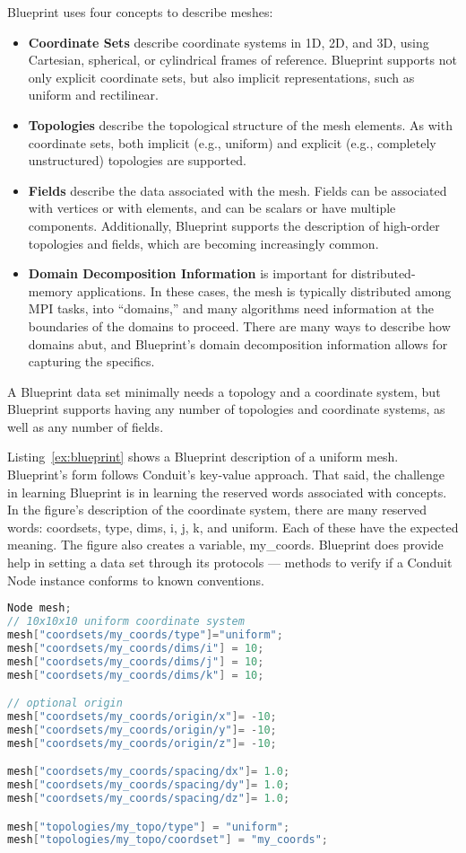 Blueprint uses four concepts to describe meshes:
\begin{itemize}
  \item \textbf{Coordinate Sets} describe coordinate systems in 1D, 2D, and 3D,
using Cartesian, spherical, or cylindrical frames of reference.
%
Blueprint supports not only explicit coordinate sets, but also implicit representations,
such as uniform and rectilinear.
  \item \textbf{Topologies} describe the topological structure of the mesh elements.
%
As with coordinate sets, both implicit (e.g., uniform) and explicit
(e.g., completely unstructured) topologies are supported.
  \item \textbf{Fields} describe the data associated with the mesh.
Fields can be associated with vertices or with elements, and
can be scalars or have multiple components.
%
Additionally, Blueprint supports the description of high-order
topologies and fields, which are becoming increasingly common.
  \item \textbf{Domain Decomposition Information} is important for distributed-memory applications.
%
In these cases, the mesh is typically distributed among MPI tasks, into ``domains,'' and
many algorithms need information at the boundaries of the domains to proceed.
%
There are many ways to describe how domains abut, and Blueprint's domain decomposition information
allows for capturing the specifics.
\end{itemize}
A Blueprint data set minimally needs a topology and a coordinate system,
but Blueprint supports having any number of topologies and coordinate
systems, as well as any number of fields.
%


Listing~\ref{ex:blueprint} shows a Blueprint description of a uniform mesh.
%
Blueprint's form follows Conduit's key-value approach.
%
That said, the challenge in learning Blueprint is in learning the reserved words associated
with concepts.
%
In the figure's description of the coordinate system, there are many reserved words:
coordsets, type, dims,  i, j, k, and uniform.
%
Each of these have the expected meaning.
%
The figure also creates a variable, my\_coords.
%
Blueprint does provide help in setting a data set through its protocols ---
methods to verify if a Conduit Node instance conforms to known conventions.


\begin{lstlisting}[language=C++,caption={\label{ex:blueprint}An example of a specifying a $10^3$ uniform grid in Blueprint.}]
Node mesh;
// 10x10x10 uniform coordinate system
mesh["coordsets/my_coords/type"]="uniform";
mesh["coordsets/my_coords/dims/i"] = 10;
mesh["coordsets/my_coords/dims/j"] = 10;
mesh["coordsets/my_coords/dims/k"] = 10;

// optional origin
mesh["coordsets/my_coords/origin/x"]= -10;
mesh["coordsets/my_coords/origin/y"]= -10;
mesh["coordsets/my_coords/origin/z"]= -10;

mesh["coordsets/my_coords/spacing/dx"]= 1.0;
mesh["coordsets/my_coords/spacing/dy"]= 1.0;
mesh["coordsets/my_coords/spacing/dz"]= 1.0;

mesh["topologies/my_topo/type"] = "uniform";
mesh["topologies/my_topo/coordset"] = "my_coords";
\end{lstlisting}

